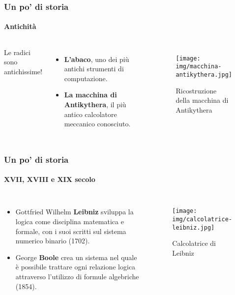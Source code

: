 \documentclass[11pt]{beamer}
\begin{document}
    \begin{frame}
        \frametitle{Un po' di storia}
        \framesubtitle{Antichità}
        
        \begin{columns}
            
            
            Le radici sono antichissime!
            
            \begin{itemize}
                \item \textbf{L'abaco}, uno dei più antichi strumenti di computazione.
                
                \item \textbf{La macchina di Antikythera}, il più antico calcolatore meccanico conosciuto.
            \end{itemize}
        
            \begin{figure}
                \texttt{[image: img/macchina-antikythera.jpg]}
                \caption{Ricostruzione della macchina di Antikythera}
            \end{figure}
        
        \end{columns}   
    \end{frame}

    \begin{frame}
        \frametitle{Un po' di storia}
        \framesubtitle{XVII, XVIII e XIX secolo}
        
        \begin{columns}
            \begin{itemize}
                \item Gottfried Wilhelm \textbf{Leibniz} sviluppa la logica come disciplina matematica e formale, con i suoi scritti sul \alert{sistema numerico binario} (1702).
                
                \item George \textbf{Boole} crea un sistema nel quale è possibile trattare ogni relazione logica attraverso l'utilizzo di \alert{formule algebriche} (1854).
            \end{itemize}
            
            \begin{figure}
                \texttt{[image: img/calcolatrice-leibniz.jpg]}
                \caption{Calcolatrice di Leibniz}
            \end{figure}
        \end{columns}
    \end{frame}
\end{document}
